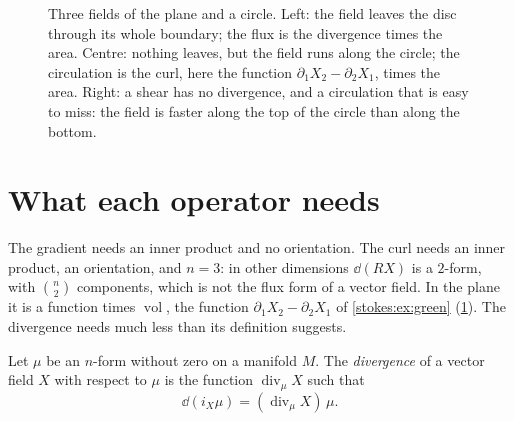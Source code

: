 \begin{notechapter}
\begin{figure}[ht]
\centering
{}
\caption{Three fields of the plane and a circle. Left: the field
leaves the disc through its whole boundary; the flux is the divergence
times the area. Centre: nothing leaves, but the field runs along the
circle; the circulation is the curl, here the function
$\partial_1X_2 - \partial_2X_1$, times the area. Right: a shear has no
divergence, and a circulation that is easy to miss: the field is
faster along the top of the circle than along the bottom.}
\label{vector-calculus:fig:fields}
\end{figure}

\section{What each operator needs}\label{vector-calculus:sec:needs}

The gradient needs an inner product and no orientation. The curl needs
an inner product, an orientation, and $n = 3$: in other dimensions
$\dd(RX)$ is a $2$-form, with $\binom n2$ components, which is not the
flux form of a vector field. In the plane it is a function times
$\operatorname{vol}$, the function
$\partial_1X_2 - \partial_2X_1$ of \cref{stokes:ex:green}
(\cref{vector-calculus:fig:fields}). The
divergence needs much less than its definition suggests.

\begin{definition}\label{vector-calculus:def:div-mu}
Let $\mu$ be an $n$-form without zero on a manifold $M$. The
\emph{divergence} of a vector field $X$ with respect to $\mu$ is the
function $\operatorname{div}_\mu X$ such that
\[
  \dd(i_X\mu) = (\operatorname{div}_\mu X)\,\mu .
\]
\end{definition}


\end{notechapter}
